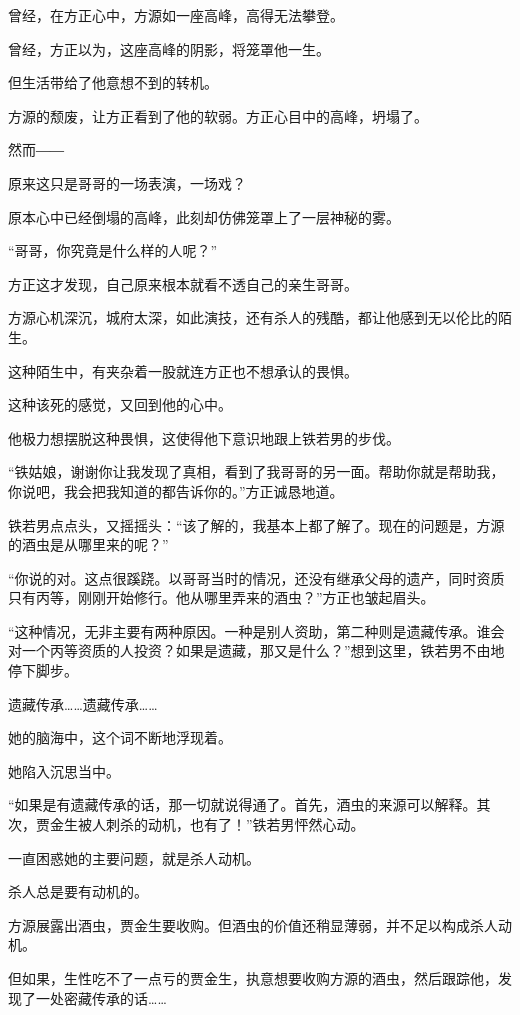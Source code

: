 
\begin{this_body}

曾经，在方正心中，方源如一座高峰，高得无法攀登。

曾经，方正以为，这座高峰的阴影，将笼罩他一生。

但生活带给了他意想不到的转机。

方源的颓废，让方正看到了他的软弱。方正心目中的高峰，坍塌了。

然而――

原来这只是哥哥的一场表演，一场戏？

原本心中已经倒塌的高峰，此刻却仿佛笼罩上了一层神秘的雾。

“哥哥，你究竟是什么样的人呢？”

方正这才发现，自己原来根本就看不透自己的亲生哥哥。

方源心机深沉，城府太深，如此演技，还有杀人的残酷，都让他感到无以伦比的陌生。

这种陌生中，有夹杂着一股就连方正也不想承认的畏惧。

这种该死的感觉，又回到他的心中。

他极力想摆脱这种畏惧，这使得他下意识地跟上铁若男的步伐。

“铁姑娘，谢谢你让我发现了真相，看到了我哥哥的另一面。帮助你就是帮助我，你说吧，我会把我知道的都告诉你的。”方正诚恳地道。

铁若男点点头，又摇摇头：“该了解的，我基本上都了解了。现在的问题是，方源的酒虫是从哪里来的呢？”

“你说的对。这点很蹊跷。以哥哥当时的情况，还没有继承父母的遗产，同时资质只有丙等，刚刚开始修行。他从哪里弄来的酒虫？”方正也皱起眉头。

“这种情况，无非主要有两种原因。一种是别人资助，第二种则是遗藏传承。谁会对一个丙等资质的人投资？如果是遗藏，那又是什么？”想到这里，铁若男不由地停下脚步。

遗藏传承……遗藏传承……

她的脑海中，这个词不断地浮现着。

她陷入沉思当中。

“如果是有遗藏传承的话，那一切就说得通了。首先，酒虫的来源可以解释。其次，贾金生被人刺杀的动机，也有了！”铁若男怦然心动。

一直困惑她的主要问题，就是杀人动机。

杀人总是要有动机的。

方源展露出酒虫，贾金生要收购。但酒虫的价值还稍显薄弱，并不足以构成杀人动机。

但如果，生性吃不了一点亏的贾金生，执意想要收购方源的酒虫，然后跟踪他，发现了一处密藏传承的话……


\end{this_body}
